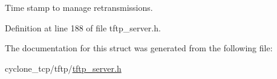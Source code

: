 Time stamp to manage retransmissions. 



Definition at line 188 of file tftp\+\_\+server.\+h.



The documentation for this struct was generated from the following file\+:\begin{DoxyCompactItemize}
\item 
cyclone\+\_\+tcp/tftp/\hyperlink{tftp__server_8h}{tftp\+\_\+server.\+h}\end{DoxyCompactItemize}
